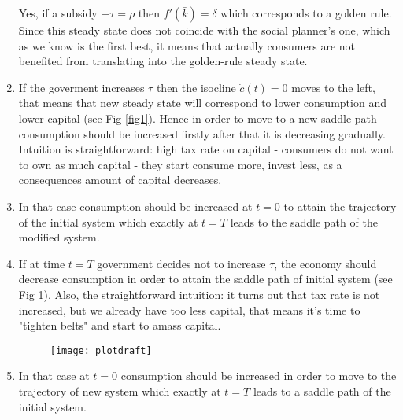\documentclass[a4paper]{article}
\begin{document}
\begin{enumerate}
Yes, if a subsidy $-\tau = \rho$ then $f'(\bar{k}) = \delta$ which corresponds to a golden rule. Since this steady state does not coincide with the social planner's one, which as we know is the first best, it means that actually consumers are not benefited from translating into the golden-rule steady state.
\item If the goverment increases $\tau$ then the isocline $\dot{c}(t) = 0$ moves to the left, that means that new steady state will correspond to lower consumption and lower capital (see Fig \ref{fig1}). Hence in order to move to a new saddle path consumption should be increased firstly after that it is decreasing gradually. Intuition is straightforward: high tax rate on capital - consumers do not want to own as much capital - they start consume more, invest less, as a consequences amount of capital decreases.
\item In that case consumption should be increased at $t=0$ to attain the trajectory of the initial system which exactly at $t=T$ leads to the saddle path of the modified system.
\item If at time $t=T$ government decides not to increase $\tau$, the economy should decrease consumption in order to attain the saddle path of initial system (see Fig \ref{fig2}). Also, the straightforward intuition: it turns out that tax rate is not increased, but we already have too less capital, that means it's time to "tighten belts" and start to amass capital.
	\begin{figure}[H]
	\centering
	\texttt{[image: plotdraft]}
	\caption{}\label{fig2}
\end{figure}
\item In that case at $t = 0$ consumption should be increased in order to move to the trajectory of new system which exactly at $t = T$ leads to a saddle path of the initial system.

	\end{enumerate}
\end{document}
